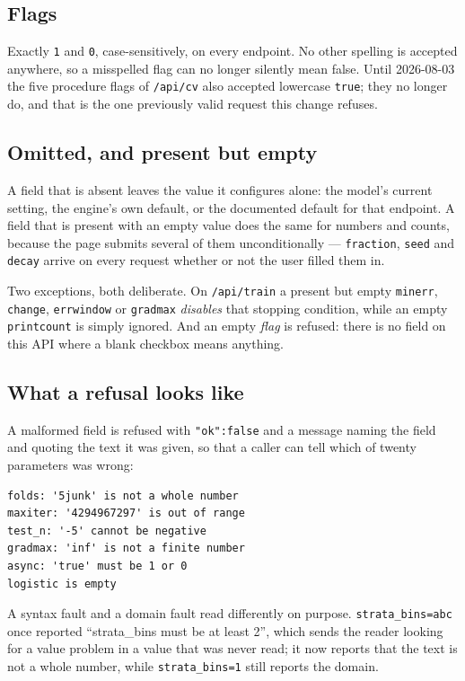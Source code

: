 \subsection*{Flags}
Exactly \texttt{1} and \texttt{0}, case-sensitively, on every endpoint.
No other spelling is accepted anywhere, so a misspelled flag can no
longer silently mean false.  Until 2026-08-03 the five procedure flags
of \texttt{/api/cv} also accepted lowercase \texttt{true}; they no
longer do, and that is the one previously valid request this change
refuses.

\subsection*{Omitted, and present but empty}
A field that is absent leaves the value it configures alone: the
model's current setting, the engine's own default, or the documented
default for that endpoint.  A field that is present with an empty value
does the same for numbers and counts, because the page submits several
of them unconditionally --- \texttt{fraction}, \texttt{seed} and
\texttt{decay} arrive on every request whether or not the user filled
them in.

Two exceptions, both deliberate.  On \texttt{/api/train} a present but
empty \texttt{minerr}, \texttt{change}, \texttt{errwindow} or
\texttt{gradmax} \emph{disables} that stopping condition, while an
empty \texttt{printcount} is simply ignored.  And an empty
\emph{flag} is refused: there is no field on this API where a blank
checkbox means anything.

\subsection*{What a refusal looks like}
A malformed field is refused with \texttt{"ok":false} and a message
naming the field and quoting the text it was given, so that a caller can
tell which of twenty parameters was wrong:

\begin{verbatim}
folds: '5junk' is not a whole number
maxiter: '4294967297' is out of range
test_n: '-5' cannot be negative
gradmax: 'inf' is not a finite number
async: 'true' must be 1 or 0
logistic is empty
\end{verbatim}

A syntax fault and a domain fault read differently on purpose.
\texttt{strata\_bins=abc} once reported ``strata\_bins must be at least
2'', which sends the reader looking for a value problem in a value that
was never read; it now reports that the text is not a whole number,
while \texttt{strata\_bins=1} still reports the domain.

